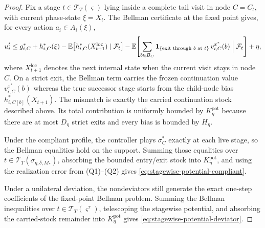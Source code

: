 \documentclass[12pt]{article}
\theoremstyle{definition}
\newcommand{\E}{\mathbb{E}}
\newcommand{\1}{\mathbf{1}}
\newcommand{\cF}{\mathcal{F}}
\begin{document}
\begin{proof}
Fix a stage $t\in\mathcal T_T(\varsigma)$ lying inside a complete tail visit in
node $C=C_t$, with current phase-state $\xi=X_t$. The Bellman certificate at the
fixed point gives, for every action $a_i\in A_i(\xi)$,
\[
u_i^t
\le
g_{i,C}^*
+
h_{i,C}^*(\xi)
-
\E\bigl[h_{i,C}^*(X_{t+1}^{\mathrm{loc}})\mid \cF_t\bigr]
-
\E\!\left[
\sum_{b\in B_C}\1_{\{\textnormal{exit through }b\textnormal{ at }t\}}
\,v_{i,C}^{x^*}(b)
\Bigm|\cF_t
\right]
+\eta,
\]
where $X_{t+1}^{\mathrm{loc}}$ denotes the next internal state when the current
visit stays in node $C$. On a strict exit, the Bellman term carries the frozen
continuation value $v_{i,C}^{x^*}(b)$ whereas the true successor stage starts from
the child-node bias $h_{i,C[b]}^*(X_{t+1})$. The mismatch is exactly the carried
continuation stock described above. Its total contribution is uniformly bounded by
$K_\eta^{\mathrm{pot}}$ because there are at most $D_\eta$ strict exits and every
bias is bounded by $H_\eta$.

Under the compliant profile, the controller plays $\sigma_C^*$ exactly at each
live stage, so the Bellman equalities hold on the support. Summing those
equalities over
$t\in\mathcal T_T(\sigma_{\eta,\delta,M_*})$, absorbing the bounded entry/exit
stock into $K_\eta^{\mathrm{pot}}$, and using the realization error from
\textnormal{(Q1)--(Q2)} gives
\eqref{eq:stagewise-potential-compliant}.

Under a unilateral deviation, the nondeviators still generate the exact one-step
coefficients of the fixed-point Bellman problem. Summing the Bellman inequalities
over $t\in\mathcal T_T(\varsigma^\tau)$, telescoping the stagewise potential, and
absorbing the carried-stock remainder into $K_\eta^{\mathrm{pot}}$ gives
\eqref{eq:stagewise-potential-deviator}.
\end{proof}
\end{document}
